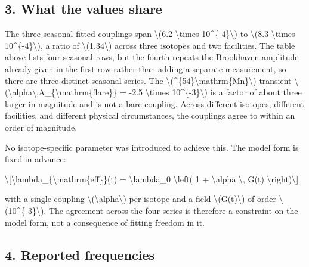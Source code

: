 \documentclass[
  10pt,
]{article}
\begin{document}
\hypertarget{what-the-values-share}{%
\subsection{3. What the values share}\label{what-the-values-share}}

The three seasonal fitted couplings span \textbackslash(6.2
\textbackslash times 10\^{}\{-4\}\textbackslash) to \textbackslash(8.3
\textbackslash times 10\^{}\{-4\}\textbackslash), a ratio of
\textbackslash(1.34\textbackslash) across three isotopes and two
facilities. The table above lists four seasonal rows, but the fourth
repeats the Brookhaven amplitude already given in the first row rather
than adding a separate measurement, so there are three distinct seasonal
series. The
\textbackslash(\^{}\{54\}\textbackslash mathrm\{Mn\}\textbackslash)
transient
\textbackslash(\textbackslash alpha\textbackslash,A\_\{\textbackslash mathrm\{flare\}\}
= -2.5 \textbackslash times 10\^{}\{-3\}\textbackslash) is a factor of
about three larger in magnitude and is not a bare coupling. Across
different isotopes, different facilities, and different physical
circumstances, the couplings agree to within an order of magnitude.

No isotope-specific parameter was introduced to achieve this. The model
form is fixed in advance:

\textbackslash{[}\textbackslash lambda\_\{\textbackslash mathrm\{eff\}\}(t)
= \textbackslash lambda\_0 \textbackslash left( 1 + \textbackslash alpha
\textbackslash, G(t) \textbackslash right)\textbackslash{]}

with a single coupling
\textbackslash(\textbackslash alpha\textbackslash) per isotope and a
field \textbackslash(G(t)\textbackslash) of order
\textbackslash(10\^{}\{-3\}\textbackslash). The agreement across the
four series is therefore a constraint on the model form, not a
consequence of fitting freedom in it.

\hypertarget{reported-frequencies}{%
\subsection{4. Reported frequencies}\label{reported-frequencies}}
\end{document}
